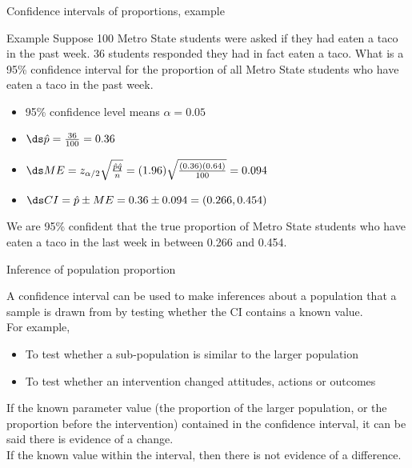 \documentclass[xcolor=table, handout]{beamer}
\begin{document}
\begin{frame}{Confidence intervals of proportions, example}
\begin{exampleblock}{Example}
\large
Suppose 100 Metro State students were asked if they had eaten a taco in the past week. 36 students responded they had in fact eaten a taco. What is a 95\% confidence interval for the proportion of all Metro State students who have eaten a taco in the past week.
\begin{itemize}
\pause\item 95\% confidence level means $\alpha = 0.05$
\pause\item $\ds \hat p = \frac {36}{100} = 0.36$
\pause\item $\ds ME = z_{\alpha/2}\sqrt{\frac {\hat p \hat q}{n}} = (1.96)\sqrt{\frac {(0.36)(0.64)}{100}} = 0.094$
\pause\item $\ds CI = \hat p \pm ME = 0.36 \pm 0.094 = (0.266, 0.454)$
\end{itemize}
\pause We are 95\% confident that the true proportion of Metro State students who have eaten a taco in the last week in between 0.266 and 0.454.
\end{exampleblock}
\end{frame}


\begin{frame}{Inference of population proportion}
\begin{block}{}
\large
A confidence interval can be used to make inferences about a population that a sample is drawn from by testing whether the CI contains a known value.\\
\pause\medskip
For example,
\begin{itemize}
\item To test whether a sub-population is similar to the larger population
\item To test whether an intervention changed attitudes, actions or outcomes
\end{itemize}

\pause If the known parameter value (the proportion of the larger population, or the proportion before the intervention)  contained in the confidence interval, it can be said there is evidence of a change.\\
\medskip
If the known value  within the interval, then there is not evidence of a difference.
\end{block}
\end{frame}
\end{document}
